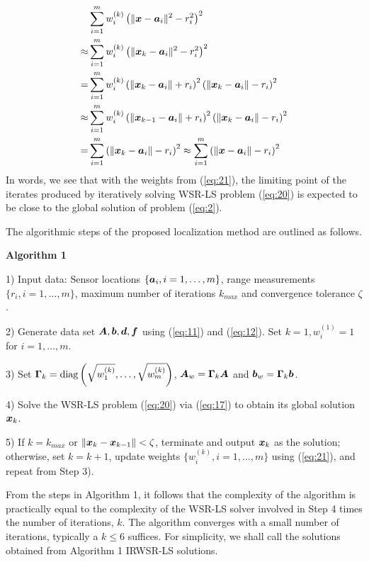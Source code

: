 \begin{equation} \label{sr:w}
\nonumber
\begin{aligned}
&\sum_{i=1}^m w_i^{(k)}\left(\|\mbox{\boldmath$x$}-\mbox{\boldmath$a$}_i\|^2-r_i^2\right)^2 \\
 \approx &\sum_{i=1}^m w_i^{(k)}\left(\|\mbox{\boldmath$x$}_k-\mbox{\boldmath$a$}_i\|^2-r_i^2\right)^2 \\
 =&\sum_{i=1}^m w_i^{(k)}\left(\|\mbox{\boldmath$x$}_k-\mbox{\boldmath$a$}_i\|+r_i\right)^2\left(\|\mbox{\boldmath$x$}_k-\mbox{\boldmath$a$}_i\|-r_i\right)^2  \\
 \approx &\sum_{i=1}^m w_i^{(k)}\left(\|\mbox{\boldmath$x$}_{k-1}-\mbox{\boldmath$a$}_i\|+r_i\right)^2\left(\|\mbox{\boldmath$x$}_k-\mbox{\boldmath$a$}_i\|-r_i\right)^2 \\
 =&\sum_{i=1}^m \left(\|\mbox{\boldmath$x$}_k-\mbox{\boldmath$a$}_i\|-r_i\right)^2 \approx \sum_{i=1}^m \left(\|\mbox{\boldmath$x$}-\mbox{\boldmath$a$}_i\|-r_i\right)^2\\
\end{aligned}
\end{equation}
In words, we see that with the weights from (\ref{eq:21}), the limiting point of the iterates produced by iteratively solving WSR-LS problem (\ref{eq:20}) is expected to be close to the global solution of problem (\ref{eq:2}).

The algorithmic steps of the proposed localization method are outlined as follows.

\noindent \textbf{Algorithm 1}

1) Input data: Sensor locations $\{\mbox{\boldmath$a$}_i, i=1,\ldots,m\}$, range measurements $\{r_i, i=1,\ldots,m\}$, maximum number of iterations $k_{max}$ and convergence tolerance $\zeta$.

2) Generate data set $\mbox{\boldmath$A$},\mbox{\boldmath$b$}, \mbox{\boldmath$d$}, \mbox{\boldmath$f$}$ using (\ref{eq:11}) and (\ref{eq:12}). Set $k=1, w_i^{(1)}=1$ for $i=1,\ldots,m$.

3) Set $\mbox{\boldmath{$\Gamma$}}_k=\mbox{diag}\left(\sqrt{w_1^{(k)}},\ldots,\sqrt{w_m^{(k)}}\right)$, $\mbox{\boldmath$A$}_w=\mbox{\boldmath{$\Gamma$}}_k\mbox{\boldmath$A$}$ and $\mbox{\boldmath$b$}_w=\mbox{\boldmath{$\Gamma$}}_k\mbox{\boldmath$b$}$.

4) Solve the WSR-LS problem (\ref{eq:20}) via (\ref{eq:17}) to obtain its global solution $\mbox{\boldmath$x$}_k$.

5) If $k=k_{max}$ or $\|\mbox{\boldmath$x$}_k-\mbox{\boldmath$x$}_{k-1}\|<\zeta$, terminate and output $\mbox{\boldmath$x$}_k$ as the solution; otherwise, set $k=k+1$, update weights $\{w_i^{(k)}, i=1,\ldots,m\}$ using (\ref{eq:21}), and repeat from Step 3).

From the steps in Algorithm 1, it follows that the complexity of the algorithm is practically equal to the complexity of the WSR-LS solver involved in Step 4 times the number of iterations, $k$. The algorithm converges with a small number of iterations, typically a $k\leq6$  suffices. For simplicity, we shall call the solutions obtained from Algorithm 1 IRWSR-LS solutions.

